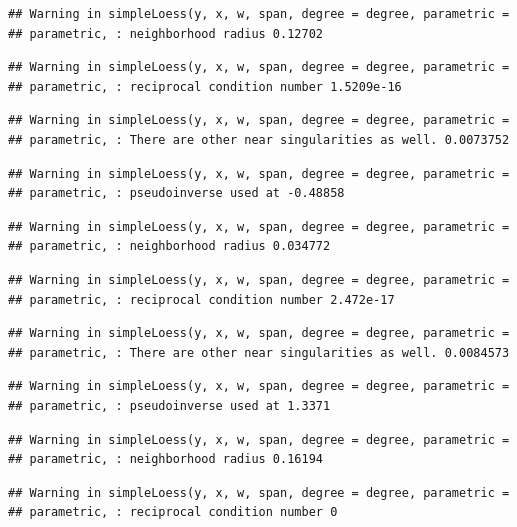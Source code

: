 \documentclass[]{article}
\begin{document}
\begin{verbatim}
## Warning in simpleLoess(y, x, w, span, degree = degree, parametric =
## parametric, : neighborhood radius 0.12702
\end{verbatim}

\begin{verbatim}
## Warning in simpleLoess(y, x, w, span, degree = degree, parametric =
## parametric, : reciprocal condition number 1.5209e-16
\end{verbatim}

\begin{verbatim}
## Warning in simpleLoess(y, x, w, span, degree = degree, parametric =
## parametric, : There are other near singularities as well. 0.0073752
\end{verbatim}

\begin{verbatim}
## Warning in simpleLoess(y, x, w, span, degree = degree, parametric =
## parametric, : pseudoinverse used at -0.48858
\end{verbatim}

\begin{verbatim}
## Warning in simpleLoess(y, x, w, span, degree = degree, parametric =
## parametric, : neighborhood radius 0.034772
\end{verbatim}

\begin{verbatim}
## Warning in simpleLoess(y, x, w, span, degree = degree, parametric =
## parametric, : reciprocal condition number 2.472e-17
\end{verbatim}

\begin{verbatim}
## Warning in simpleLoess(y, x, w, span, degree = degree, parametric =
## parametric, : There are other near singularities as well. 0.0084573
\end{verbatim}

\begin{verbatim}
## Warning in simpleLoess(y, x, w, span, degree = degree, parametric =
## parametric, : pseudoinverse used at 1.3371
\end{verbatim}

\begin{verbatim}
## Warning in simpleLoess(y, x, w, span, degree = degree, parametric =
## parametric, : neighborhood radius 0.16194
\end{verbatim}

\begin{verbatim}
## Warning in simpleLoess(y, x, w, span, degree = degree, parametric =
## parametric, : reciprocal condition number 0
\end{verbatim}
\end{document}
